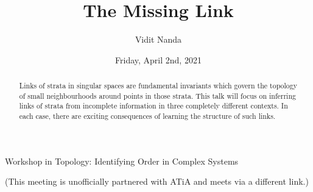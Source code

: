 \documentclass{UAmathtalk}
\author{Vidit Nanda}
\title{The Missing Link}
\date{Friday, April 2nd, 2021}
\begin{document}
\maketitle

\begin{center}
\Large{Workshop in Topology: Identifying Order in Complex Systems}

\normalsize{(This meeting is unofficially partnered with ATiA and meets via a different link.)}
\end{center}

\begin{abstract}
Links of strata in singular spaces are fundamental invariants which govern the topology of small neighbourhoods around points in those strata. This talk will focus on inferring links of strata from incomplete information in three completely different contexts. In each case, there are exciting consequences of learning the structure of such links.
\end{abstract}
\end{document}
